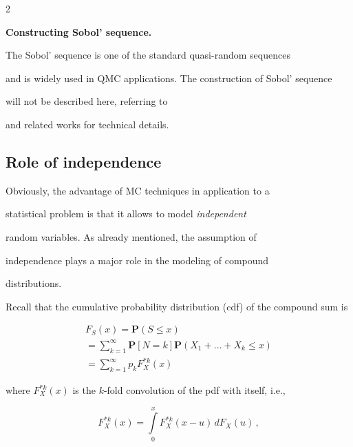 \begin{multicols}{2}
\medskip



\noindent

\textbf{Constructing Sobol' sequence.}

The Sobol' sequence is one of the standard quasi-random sequences

and is widely used in QMC applications. The construction of Sobol' sequence

will not be described here, referring to~\cite{Sob1, Sob2}

and related works for technical details.



\subsection{Role of independence}



\noindent

Obviously, the advantage of MC techniques in application to a

statistical problem is that it allows to model {\it independent}

random variables. As already mentioned, the assumption of

independence plays a major role in the modeling of compound

distributions.



Recall that the cumulative probability distribution (cdf) of the compound sum is

\begin{multline}

\label{WLLW}

F_S(x)=\mathbf{P}(S\leq x)\\

{}=

\sum_{k=1}^{\infty}\mathbf{P}[N=k]\mathbf{P}\left(

{X_1 + \dots + X_k\leq x}\right)\\

{}=\sum_{k=1}^{\infty} p_k F_X^{*k}(x)

\end{multline}

where $F_X^{*k}(x)$ is the $k$-fold convolution of the pdf with itself, i.e.,

\begin{equation}

\label{convolut}

F_X^{*k}(x)=\int\limits_0^{x}F_X^{*k}(x-u)\,dF_X(u)\,,


\end{equation}
\end{multicols}
